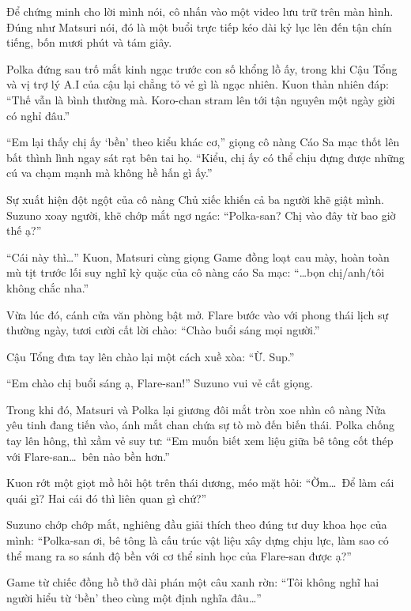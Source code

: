 \documentclass[../main.tex]{subfiles}
\begin{document}
Để chứng minh cho lời mình nói, cô nhấn vào một video lưu trữ trên màn hình. Đúng như Matsuri nói, đó là một buổi trực tiếp kéo dài kỷ lục lên đến tận chín tiếng, bốn mươi phút và tám giây.


Polka đứng sau trố mắt kinh ngạc trước con số khổng lồ ấy, trong khi Cậu Tổng và vị trợ lý A.I của cậu lại chẳng tỏ vẻ gì là ngạc nhiên. Kuon thản nhiên đáp: ``Thế vẫn là bình thường mà. Koro-chan stram lên tới tận nguyên một ngày giời có nghỉ đâu.''

``Em lại thấy chị ấy `bền' theo kiểu khác cơ,'' giọng cô nàng Cáo Sa mạc thốt lên bất thình lình ngay sát rạt bên tai họ. ``Kiểu, chị ấy có thể chịu đựng được những cú va chạm mạnh mà không hề hấn gì ấy.''

Sự xuất hiện đột ngột của cô nàng Chủ xiếc khiến cả ba người khẽ giật mình. Suzuno xoay người, khẽ chớp mắt ngơ ngác: ``Polka-san? Chị vào đây từ bao giờ thế ạ?''

``Cái này thì\dots'' Kuon, Matsuri cùng giọng Game đồng loạt cau mày, hoàn toàn mù tịt trước lối suy nghĩ kỳ quặc của cô nàng cáo Sa mạc: ``\dots bọn chị/anh/tôi không chắc nha.''

Vừa lúc đó, cánh cửa văn phòng bật mở. Flare bước vào với phong thái lịch sự thường ngày, tươi cười cất lời chào: ``Chào buổi sáng mọi người.''

Cậu Tổng đưa tay lên chào lại một cách xuề xòa: ``Ừ. Sup.''

``Em chào chị buổi sáng ạ, Flare-san!'' Suzuno vui vẻ cất giọng.

Trong khi đó, Matsuri và Polka lại giương đôi mắt tròn xoe nhìn cô nàng Nửa yêu tinh đang tiến vào, ánh mắt chan chứa sự tò mò đến biến thái. Polka chống tay lên hông, thì xầm vẻ suy tư: ``Em muốn biết xem liệu giữa bê tông cốt thép với Flare-san\dots\ bên nào bền hơn.''


Kuon rớt một giọt mồ hôi hột trên thái dương, méo mặt hỏi: ``Ờm\dots\ Để làm cái quái gì? Hai cái đó thì liên quan gì chứ?''

Suzuno chớp chớp mắt, nghiêng đầu giải thích theo đúng tư duy khoa học của mình: ``Polka-san ơi, bê tông là cấu trúc vật liệu xây dựng chịu lực, làm sao có thể mang ra so sánh độ bền với cơ thể sinh học của Flare-san được ạ?''

Game từ chiếc đồng hồ thở dài phán một câu xanh rờn: ``Tôi không nghĩ hai người hiểu từ `bền' theo cùng một định nghĩa đâu\dots''
\end{document}
